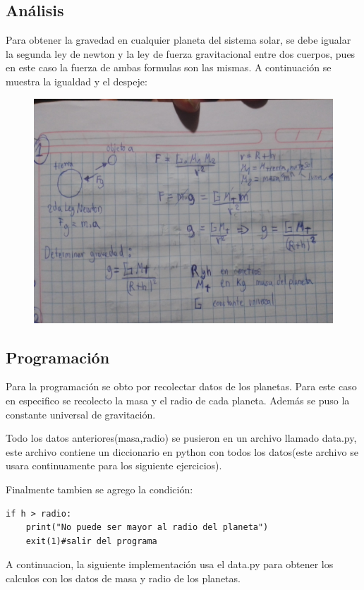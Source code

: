 \documentclass[a4paper,12pt]{article}
\begin{document}
    \subsection{Análisis}
        Para obtener la gravedad en cualquier planeta del sistema 
        solar, se debe igualar la segunda ley de newton y la ley 
        de fuerza gravitacional entre dos cuerpos, pues en este
        caso la fuerza de ambas formulas son las mismas.
        A continuación se muestra la igualdad y el despeje:
        \begin{figure}[!htbp]
            \centering
            \includegraphics[scale=0.3]{ejer1fc}
        \end{figure}
    \newpage
    \subsection{Programación}
        Para la programación se obto por recolectar datos de los planetas.
        Para este caso en especifico se recolecto la masa y el radio de 
        cada planeta. Además se puso la constante universal de gravitación.
        
        Todo los datos anteriores(masa,radio) se pusieron en un 
        archivo llamado data.py, este archivo contiene un diccionario 
        en python con todos los datos(este archivo se usara continuamente
        para los siguiente ejercicios).
        

        Finalmente tambien se agrego la condición:
        \begin{lstlisting}
if h > radio:
    print("No puede ser mayor al radio del planeta")
    exit(1)#salir del programa    
        \end{lstlisting}
        A continuacion, la siguiente implementación usa el data.py para obtener los calculos con los datos de masa y radio de los planetas.
        
\end{document}
